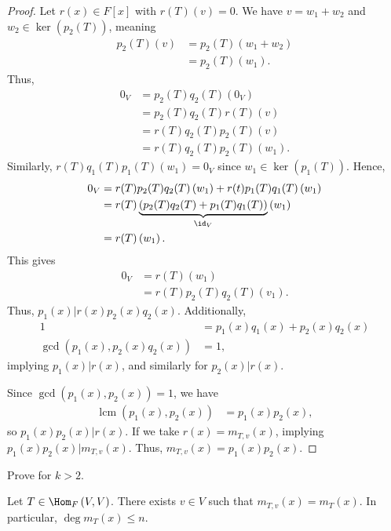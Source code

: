 \documentclass[10pt]{mypackage}
\DeclareMathOperator*{\lcm}{lcm}
\begin{document}
\begin{proof}
Let $r(x)\in F[x]$ with $r(T)(v) = 0$. We have $v = w_1 + w_2$ and $w_2\in \ker\left( p_2(T)\right)$, meaning
\begin{align*}
  p_2(T)(v) &= p_2(T)\left(w_1 + w_2\right)\\
            &= p_2(T)\left(w_1\right).
\end{align*}
Thus,
\begin{align*}
  0_V &= p_2(T)q_2(T)\left(0_V\right)\\
      &= p_2(T)q_2(T)r(T)(v)\\
      &= r(T)q_2(T)p_2(T)(v)\\
      &= r(T)q_2(T)p_2(T)\left(w_1\right).
\end{align*}
Similarly, $r(T)q_1(T)p_1(T)\left(w_1\right) = 0_V$ since $w_1\in \ker\left(p_1(T)\right)$. Hence,
\begin{align*}
  0_V &= r(T)p_2(T)q_2(T)\left(w_1\right) + r(t)p_1(T)q_1(T)\left(w_1\right)\\
      &= r(T)\underbrace{\left(p_2(T)q_2(T) + p_1(T)q_1(T)\right)}_{\id_V}\left(w_1\right)\\
      &= r(T)\left(w_1\right).
\end{align*}
This gives
\begin{align*}
  0_V &= r(T)\left(w_1\right)\\
      &= r(T)p_2(T)q_2(T)\left(v_1\right).
\end{align*}
Thus, $p_1(x)|r(x)p_2(x)q_2(x)$. Additionally,
\begin{align*}
  1 &= p_1(x)q_1(x) + p_2(x)q_2(x)\\
  \gcd\left(p_1(x),p_2(x)q_2(x)\right) &= 1,
\end{align*}
implying $p_1(x)|r(x)$, and similarly for $p_2(x) | r(x)$.\newline

Since $\gcd\left(p_1(x),p_2(x)\right) = 1$, we have
\begin{align*}
  \lcm\left(p_1(x),p_2(x)\right) &= p_1(x)p_2(x),
\end{align*}
so $p_1(x)p_2(x) | r(x)$. If we take $r(x) = m_{T,v}(x)$, implying $p_1(x)p_2(x)|m_{T,v}(x)$. Thus, $m_{T,v}(x) = p_1(x)p_2(x)$.
\end{proof}
\begin{exercise}
  Prove for $k > 2$.
\end{exercise}
\begin{theorem}
  Let $T\in \Hom_{F}\left(V,V\right)$. There exists $v\in V$ such that $m_{T,v}\left(x\right) = m_{T}(x)$. In particular, $\deg m_{T}(x) \leq n$.
\end{theorem}
\end{document}
